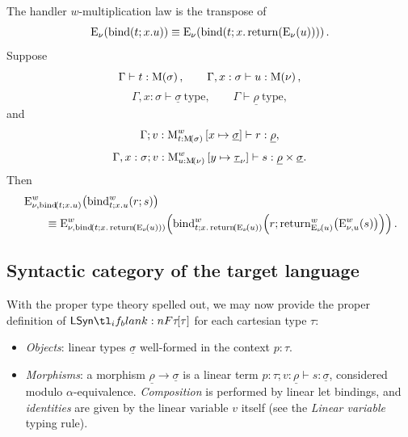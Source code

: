 \documentclass[11pt,a4paper]{article}
\theoremstyle{definition}
\theoremstyle{remark}
\providecommand{\lintype}[1]{\underline{#1}}
\begin{document}
The handler \(w\)-multiplication law is the transpose of
\[
  \fn[n]{\opn[b]{E}_{\nu}}{
    \fn[n]{\opn[b]{bind}}{t;x.u}
  }
  \equiv
  \fn[n]{\opn[b]{E}_{\nu}}{
    \fn[n]{\opn[b]{bind}}{
      t;
      x.\fn[n]{\opn[b]{return}}{
        \fn[n]{\opn[b]{E}_{\nu}}{u}
      }
    }
  }.
\]
Suppose
\[
  \Gamma\vdash t:\Fun[nn]{\opn[b]{M}}{\sigma},
  \qquad
  \Gamma,x:\sigma\vdash u:\Fun[nn]{\opn[b]{M}}{\nu},
\]
\[
  \Gamma,x:\sigma\vdash \lintype{\sigma}\ \mathrm{type},
  \qquad
  \Gamma\vdash \lintype{\rho}\ \mathrm{type},
\]
and
\[
  \Gamma;
  v:
  \opn[b]{M}^{w}_{t:\Fun[nn]{\opn[b]{M}}{\sigma}}
  \left[x\mapsto\lintype{\sigma}\right]
  \vdash r:\lintype{\rho},
\]
\[
  \Gamma,x:\sigma;
  v:
  \opn[b]{M}^{w}_{u:\Fun[nn]{\opn[b]{M}}{\nu}}
  \left[y\mapsto\lintype{\tau}_{\nu}\right]
  \vdash s:\lintype{\rho}\times\lintype{\sigma}.
\]
Then
\begin{equation}
  \label{eq:appendix-target-language-handler-w-multiplication}
  \begin{aligned}
    &
    \fn[n]{
      \opn[b]{E}^{w}_{
        \nu,
        \fn[n]{\opn[b]{bind}}{t;x.u}
      }
    }{
      \fn[n]{\opn[b]{bind}^{w}_{t;x.u}}{
        r;
        s
      }
    }
    \\
    &\qquad\equiv
    \fn[n]{
      \opn[b]{E}^{w}_{
        \nu,
        \fn[n]{\opn[b]{bind}}{
          t;
          x.\fn[n]{\opn[b]{return}}{
            \fn[n]{\opn[b]{E}_{\nu}}{u}
          }
        }
      }
    }{
      \fn[n]{
        \opn[b]{bind}^{w}_{
          t;
          x.\fn[n]{\opn[b]{return}}{
            \fn[n]{\opn[b]{E}_{\nu}}{u}
          }
        }
      }{
        r;
        \fn[n]{
          \opn[b]{return}^{w}_{
            \fn[n]{\opn[b]{E}_{\nu}}{u}
          }
        }{
          \fn[n]{\opn[b]{E}^{w}_{\nu,u}}{s}
        }
      }
    } .
  \end{aligned}
\end{equation}


\subsection{Syntactic category of the target language}
\label{sec:appendix-syntactic-category-of-the-target-language}

With the proper type theory spelled out, we may now provide the proper definition of \( \LSyn[\tau] \) for each cartesian type \( \tau \):
\begin{itemize}
\item \emph{Objects}: linear types \( \lintype{\sigma} \) well-formed in the context \( p: \tau \).
\item \emph{Morphisms}: a morphism \( \lintype{\rho} \to \lintype{\sigma} \) is a linear term \( p: \tau; v : \lintype{\rho} \vdash s : \lintype{\sigma} \), considered modulo \( \alpha \)-equivalence. \emph{Composition} is performed by linear let bindings, and \emph{identities} are given by the linear variable \( v \) itself (see the \emph{Linear variable} typing rule).
\end{itemize}
\end{document}
